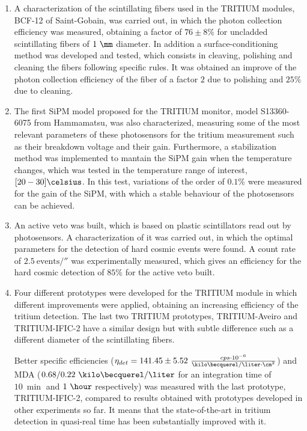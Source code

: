 \begin{enumerate}
\item{} A characterization of the scintillating fibers used in the TRITIUM modules, BCF-12 of Saint-Gobain, was carried out, in which the photon collection efficiency was measured, obtaining a factor of $76 \pm 8 \%$ for uncladded scintillating fibers of $1~\mm$ diameter. In addition a surface-conditioning method was developed and tested, which consists in cleaving, polishing and cleaning the fibers following specific rules. It was obtained an improve of the photon collection efficiency of the fiber of a factor $2$ due to polishing and $25\%$ due to cleaning.

\item{} The first SiPM model proposed for the TRITIUM monitor, model S13360-6075 from Hammamatsu, was also characterized, measuring some of the most relevant parameters of these photosensors for the tritium measurement such as their breakdown voltage and their gain. Furthermore, a stabilization method was implemented to mantain the SiPM gain when the temperature changes, which was tested in the temperature range of interest, $[20-30]\celsius$. In this test, variations of the order of $0.1\%$  were measured for the gain of the SiPM, with which a stable behaviour of the photosensors can be achieved.

\item{} An active veto was built, which is based on plastic scintillators read out by photosensors. A characterization of it was carried out, in which the optimal parameters for the detection of hard cosmic events were found. A count rate of $2.5~\text{events}/\second$ was experimentally measured, which gives an efficiency for the hard cosmic detection of $85\%$ for the active veto built.

\item{} Four different prototypes were developed for the TRITIUM module in which different improvements were applied, obtaining an increasing efficiency of the tritium detection. The last two TRITIUM prototypes, TRITIUM-Aveiro and TRITIUM-IFIC-2 have a similar design but with subtle difference such as a different diameter of the scintillating fibers.

Better specific efficiencies ($\eta_{det} = 141.45\pm5.52~\frac{cps \cdot{} 10^{-6}}{\kilo\becquerel/ \liter \cdot{} \cm^2}$) and MDA ($0.68 /0.22~\kilo\becquerel / \liter$ for an integration time of $10~\min$ and $1~\hour$ respectively) was measured with the last prototype,  TRITIUM-IFIC-2, compared to results obtained with prototypes developed in other experiments so far. It means that the state-of-the-art in tritium detection in quasi-real time has been substantially improved with it. 


\end{enumerate}
